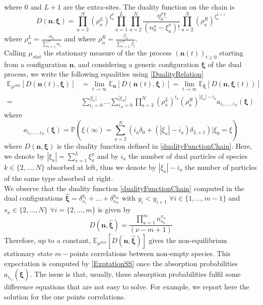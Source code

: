 \documentclass[11pt]{article}
\numberwithin{equation}{section}
\numberwithin{equation}{subsection}
\begin{document}
where $0$ and $L+1$ are the extra-sites. The duality function on the chain is
\begin{equation}\label{dualityFunctionChain}
    D(\bm{n},\bm{\xi})=\prod_{a=2}^{N}\left(\rho_{a}^{L}\right)^{\xi_{a}^{0}}\prod_{x=1}^{L}\prod_{a=2}^{N}\frac{\eta_{a}^{x}!}{(n_{a}^{x}-\xi_{a}^{x})!}\prod_{a=2}^{N}\left(\rho_{a}^{R}\right)^{\xi_{a}^{L+1}}
\end{equation}
where $\rho_{\alpha}^{L}=\frac{\alpha_{a}}{\sum_{i=1}^{N}\alpha_{i}}$ and where $\rho_{\alpha}^{R}=\frac{\beta_{a}}{\sum_{i=1}^{N}\beta_{i}}$.\\
Calling $\mu_{stat}$ the stationary measure of the the process $(\bm{n}(t))_{t\geq 0}$ starting from a configuration $\bm{n}$, and considering a generic configuration $\bm{\xi}$ of the dual process, we write the following equalities using \eqref{DualityRelation}
\begin{equation}\label{ExptationSS}
\begin{split}
\mathbb{E}_{\mu^{stat}}\left[D(\bm{n}(t),\bm{\xi})\right]&=\lim_{t\to\infty}\mathbb{E}_{\bm{n}}\left[D(\bm{n}(t),\bm{\xi})\right]=\lim_{t\to\infty}\mathbb{E}_{\bm{\xi}}\left[D(\bm{n},\bm{\xi}(t))\right]
\\=&
\sum_{i_{1}=0}^{|\xi_{1}|}\ldots\sum_{i_{N}=0}^{|\xi_{N}|}\prod_{a=2}^{N}\left(\rho_{a}^{L}\right)^{i_{a}}\left(\rho_{a}^{R}\right)^{|\xi_{a}|-i_{a}}a_{i_{1},\ldots,i_{N}}(\bm{\xi})
\end{split}
\end{equation}
where 
\begin{equation}\label{Pass}
    a_{i_{1},\ldots,i_{N}}(\bm{\xi})=\mathbb{P}\left(\xi(\infty)=\sum_{a=2}^{N}\left(i_{a}\delta_{0}+(|\xi_{a}|-i_{a})\delta_{L+1}\right)| \xi_{0}=\xi\right)
\end{equation}
where $D(\bm{n},\bm{\xi})$ is the duality function defined in \eqref{dualityFunctionChain}. Here, we denote by $|\xi_{a}|=\sum_{x=1}^{L}\xi_{a}^{x}$ and by $i_{a}$ the number of dual particles of species $k\in\{2,\ldots,N\}$ absorbed at left, thus we denote by $|\xi_{a}|-i_{a}$ the number of particles of the same type absorbed at right.\\
We observe that the duality function \eqref{dualityFunctionChain} computed in the dual configurations $\bm{\widehat{\xi}}=\delta_{s_{1}}^{y_{1}}+\ldots+\delta_{s_{m}}^{y_{m}}$ with $y_{i}<y_{i+1}$ $\forall i\in \{1,\ldots,m-1\}$ and $s_{x}\in \{2,\ldots,N\}$ $\forall i=\{2,\ldots,m\}$ is given by 
\begin{equation}
    D(\bm{n},\bm{\widehat{\xi}})= \frac{\prod_{a=1}^{m}n_{s_{a}}^{x_{a}}}{(\nu-m+1)}
\end{equation}
Therefore, up to a constant, $\mathbb{E}_{\mu^{\text{stat}}}\left[D(\bm{n},\bm{\widehat{\xi}})\right]$ gives the non-equilibrium stationary state $m-$points correlations between non-empty species. This expectation is computed by \eqref{ExptationSS} once the absorption probabilities $a_{i_{s_{a}}}(\widehat{\bm{\xi}})$. The issue is that, usually, these absorption probabilities fulfil some difference equations that are not easy to solve. For example, we report here the solution for the one points correlations. 
\end{document}
